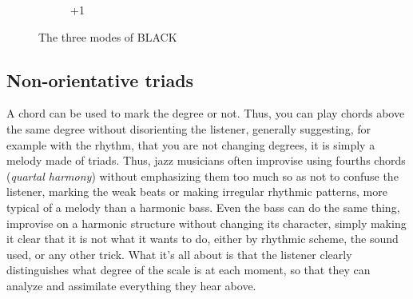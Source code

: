 \documentclass[]{report}
\begin{document}
\begin{figure}[H]
\begin{subfigure}{0.3\textwidth}
		\caption{\textsf{+1}}

	\end{subfigure}
	\caption{The three modes of \textsf{BLACK}}\label{fig:the-black-modes}
\end{figure}


\subsection{Non-orientative triads}
A chord can be used to mark the degree or not. Thus, you can play chords above the same degree without disorienting the listener, generally suggesting, for example with the rhythm, that you are not changing degrees, it is simply a melody made of triads. Thus, jazz musicians often improvise using fourths chords (\emph{quartal harmony}) without emphasizing them too much so as not to confuse the listener, marking the weak beats or making irregular rhythmic patterns, more typical of a melody than a harmonic bass. Even the bass can do the same thing, improvise on a harmonic structure without changing its character, simply making it clear that it is not what it wants to do, either by rhythmic scheme, the sound used, or any other trick. What it's all about is that the listener clearly distinguishes what degree of the scale is at each moment, so that they can analyze and assimilate everything they hear above.
\end{document}
